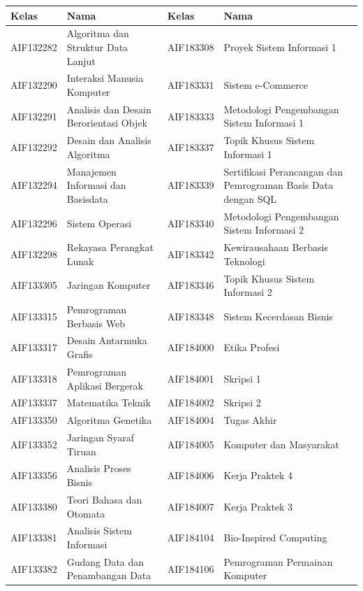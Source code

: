 \begin{enumerate}
\begin{table}[H]
\centering
\label{tab:kelasmatakuliah2018_2}
\begin{tabular}{|p{3.25cm}|p{4.25cm}|p{3.25cm}|p{4.25cm}|}
\hline
\textbf{Kelas} & \textbf{Nama} & \textbf{Kelas} & \textbf{Nama} \\ \hline
AIF132282 & Algoritma dan Struktur Data Lanjut & AIF183308 & Proyek Sistem Informasi 1 \\ \hline
AIF132290 & Interaksi Manusia Komputer & AIF183331 & Sistem e-Commerce \\ \hline
AIF132291 & Analisis dan Desain Berorientasi Objek & AIF183333 & Metodologi Pengembangan Sistem Informasi 1 \\ \hline
AIF132292 & Desain dan Analisis Algoritma & AIF183337 & Topik Khusus Sistem Informasi 1 \\ \hline
AIF132294 & Manajemen Informasi dan Basisdata & AIF183339 & Sertifikasi Perancangan dan Pemrograman Basis Data dengan SQL \\ \hline
AIF132296 & Sistem Operasi & AIF183340 & Metodologi Pengembangan Sistem Informasi 2 \\ \hline
AIF132298 & Rekayasa Perangkat Lunak & AIF183342 & Kewirausahaan Berbasis Teknologi \\ \hline
AIF133305 & Jaringan Komputer & AIF183346 & Topik Khusus Sistem Informasi 2 \\ \hline
AIF133315 & Pemrograman Berbasis Web & AIF183348 & Sistem Kecerdasan Bisnis \\ \hline
AIF133317 & Desain Antarmuka Grafis & AIF184000 & Etika Profesi \\ \hline
AIF133318 & Pemrograman Aplikasi Bergerak & AIF184001 & Skripsi 1 \\ \hline
AIF133337 & Matematika Teknik & AIF184002 & Skripsi 2 \\ \hline
AIF133350 & Algoritma Genetika & AIF184004 & Tugas Akhir \\ \hline
AIF133352 & Jaringan Syaraf Tiruan & AIF184005 & Komputer dan Masyarakat \\ \hline
AIF133356 & Analisis Proses Bisnis & AIF184006 & Kerja Praktek 4 \\ \hline
AIF133380 & Teori Bahasa dan Otomata & AIF184007 & Kerja Praktek 3 \\ \hline
AIF133381 & Analisis Sistem Informasi & AIF184104 & Bio-Inspired Computing \\ \hline
AIF133382 & Gudang Data dan Penambangan Data & AIF184106 & Pemrograman Permainan Komputer \\ \hline

\end{tabular}
\end{table}
\end{enumerate}
